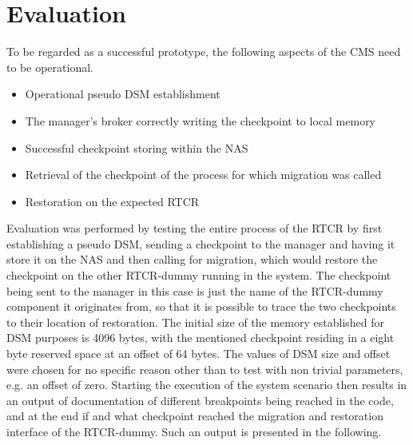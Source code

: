 
\chapter{Evaluation}\label{chapter:evaluation}
To be regarded as a successful prototype, the following aspects of the CMS need to be operational.
\begin{itemize}
    \item Operational pseudo DSM establishment 
    \item The manager's broker correctly writing the checkpoint to local memory
    \item Successful checkpoint storing within the NAS
    \item Retrieval of the checkpoint of the process for which migration was called
    \item Restoration on the expected RTCR
\end{itemize}
Evaluation was performed by testing the entire process of the RTCR by first establishing a pseudo DSM, sending a checkpoint to the manager and having it store it on the NAS and then calling for migration, which would restore the checkpoint on the other RTCR-dummy running in the system. The checkpoint being sent to the manager in this case is just the name of the RTCR-dummy component it originates from, so that it is possible to trace the two checkpoints to their location of restoration. The initial size of the memory established for DSM purposes is 4096 bytes, with the mentioned checkpoint residing in a eight byte reserved space at an offset of 64 bytes. The values of DSM size and offset were chosen for no specific reason other than to test with non trivial parameters, e.g. an offset of zero. Starting the execution of the system scenario then results in an output of documentation of different breakpoints being reached in the code, and at the end if and what checkpoint reached the migration and restoration interface of the RTCR-dummy. Such an output is presented in the following.
